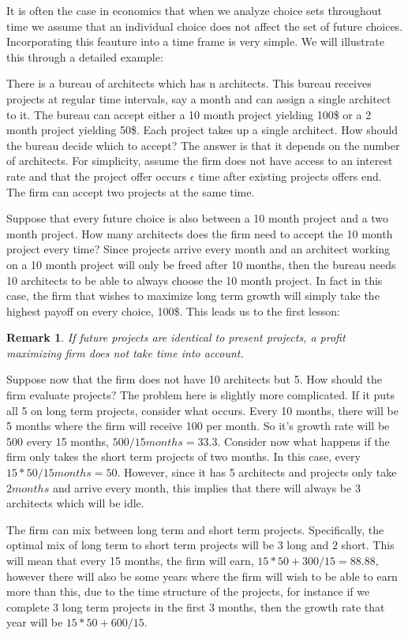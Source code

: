 \documentclass[12pt]{report}
\newtheorem{remark}{Remark}
\numberwithin{equation}{section}
\begin{document}
It is often the case in economics that when we analyze choice sets throughout time we assume that an individual choice does not affect the set of future choices. Incorporating this feauture into a time frame is very simple. We will illustrate this through a detailed example: 

There is a bureau of architects which has n architects. This bureau receives projects at regular time intervals, say a month and can assign a single architect to it. The bureau can accept either a 10 month project yielding 100\$ or a 2 month project yielding 50\$. Each project takes up a single architect. How should the bureau decide which to accept? The answer is that it depends on the number of architects. For simplicity, assume the firm does not have access to an interest rate and that the project offer occurs $\epsilon$ time after existing projects offers end. The firm can accept two projects at the same time. 

Suppose that every future choice is also between a 10 month project and a two month project. How many architects does the firm need to accept the 10 month project every time? Since projects arrive every month and an architect working on a 10 month project will only be freed after 10 months, then the bureau needs 10 architects to be able to always choose the 10 month project. In fact in this case, the firm that wishes to maximize long term growth will simply take the highest payoff on every choice, 100\$. This leads us to the first lesson:

\begin{remark}
If future projects are identical to present projects, a profit maximizing firm does not take time into account. 
\end{remark}

Suppose now that the firm does not have 10 architects but 5. How should the firm evaluate projects? The problem here is slightly more complicated. If it puts all 5 on long term projects, consider what occurs. Every 10 months, there will be 5 months where the firm will receive 100 per month. So it's growth rate will be 500 every 15 months, $500/15months=33.3$. Consider now what happens if the firm only takes the short term projects of two months. In this case, every $15*50/15 months=50$. However, since it has 5 architects and projects only take $2 months$ and arrive every month, this implies that there will always be 3 architects which will be idle. 

The firm can mix between long term and short term projects. Specifically, the optimal mix of long term to short term projects will be $3$ long and $2$ short. This will mean that every 15 months, the firm will earn, $15*50+300/15=88.88$, however there will also be some years where the firm will wish to be able to earn more than this, due to the time structure of the projects, for instance if we complete 3 long term projects in the first 3 months, then the growth rate that year will be $15*50+600/15$. 
\end{document}
